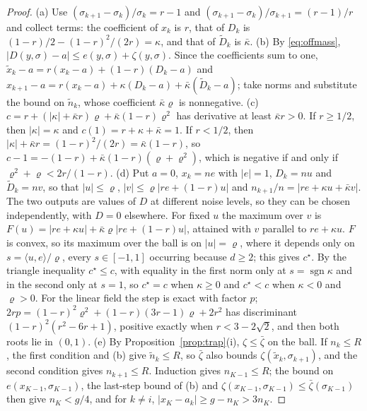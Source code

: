 \documentclass{article} %
\theoremstyle{plain}
\theoremstyle{definition}
\theoremstyle{remark}
\begin{document}
\begin{proof}
(a) Use $(\sigma_{k+1}-\sigma_k)/\sigma_k=r-1$ and $(\sigma_{k+1}-\sigma_k)/\sigma_{k+1}=(r-1)/r$ and
collect terms: the coefficient of $x_k$ is $r$, that of $D_k$ is
$(1-r)/2-(1-r)^2/(2r)=\kappa$, and that of $\tilde D_k$ is $\bar\kappa$.
(b) By \eqref{eq:offmass}, $|D(y,\sigma)-a|\le e(y,\sigma)+\zeta(y,\sigma)$. Since the coefficients sum
to one, $\tilde x_k-a=r(x_k-a)+(1-r)(D_k-a)$ and
$x_{k+1}-a=r(x_k-a)+\kappa(D_k-a)+\bar\kappa(\tilde D_k-a)$; take norms and substitute the bound on
$\tilde n_k$, whose coefficient $\bar\kappa\varrho$ is nonnegative.
(c) $c=r+(|\kappa|+\bar\kappa r)\varrho+\bar\kappa(1-r)\varrho^2$ has derivative at least $\bar\kappa r>0$. If
$r\ge1/2$, then $|\kappa|=\kappa$ and $c(1)=r+\kappa+\bar\kappa=1$. If $r<1/2$, then
$|\kappa|+\bar\kappa r=(1-r)^2/(2r)=\bar\kappa(1-r)$, so $c-1=-(1-r)+\bar\kappa(1-r)(\varrho+\varrho^2)$, which is
negative if and only if $\varrho^2+\varrho<2r/(1-r)$.
(d) Put $a=0$, $x_k=ne$ with $|e|=1$, $D_k=nu$ and $\tilde D_k=nv$, so that $|u|\le\varrho$,
$|v|\le\varrho|re+(1-r)u|$ and $n_{k+1}/n=|re+\kappa u+\bar\kappa v|$. The two outputs are values of $D$
at different noise levels, so they can be chosen independently, with $D=0$ elsewhere. For fixed
$u$ the maximum over $v$ is $F(u)=|re+\kappa u|+\bar\kappa\varrho|re+(1-r)u|$, attained with $v$
parallel to $re+\kappa u$. $F$ is convex, so its maximum over the ball is on $|u|=\varrho$, where it
depends only on $s=\langle u,e\rangle/\varrho$, every $s\in[-1,1]$ occurring because $d\ge2$; this gives
$c^\star$. By the triangle inequality $c^\star\le c$, with equality in the first norm only at
$s=\operatorname{sgn}\kappa$ and in the second only at $s=1$, so $c^\star=c$ when $\kappa\ge0$ and
$c^\star<c$ when $\kappa<0$ and $\varrho>0$. For the linear field the step is exact with factor $p$;
$2rp=(1-r)^2\varrho^2+(1-r)(3r-1)\varrho+2r^2$ has discriminant $(1-r)^2(r^2-6r+1)$, positive
exactly when $r<3-2\sqrt2$, and then both roots lie in $(0,1)$.
(e) By Proposition~\ref{prop:trap}(i), $\zeta\le\bar\zeta$ on the ball. If $n_k\le R$, the first
condition and (b) give $\tilde n_k\le R$, so $\bar\zeta$ also bounds $\zeta(\tilde x_k,\sigma_{k+1})$, and the
second condition gives $n_{k+1}\le R$. Induction gives $n_{K-1}\le R$; the bound on $e(x_{K-1},\sigma_{K-1})$, the last-step bound of (b)
and $\zeta(x_{K-1},\sigma_{K-1})\le\bar\zeta(\sigma_{K-1})$ then give $n_K<g/4$, and for
$k\ne i$, $|x_K-a_k|\ge g-n_K>3n_K$.
\end{proof}

\end{document}
